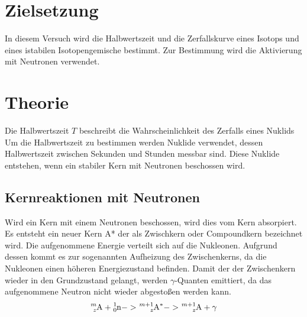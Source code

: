 \section{Zielsetzung}
In diesem Versuch wird die Halbwertszeit und die Zerfallskurve eines Isotops und eines istabilen Isotopengemische bestimmt.
Zur Bestimmung wird die Aktivierung mit Neutronen verwendet.
\section{Theorie}
\label{sec:Theorie}
Die Halbwertszeit $T$ beschreibt die Wahrscheinlichkeit des Zerfalls eines Nuklids
Um die Halbwertszeit zu bestimmen werden Nuklide verwendet, dessen Halbwertszeit zwischen Sekunden und Stunden messbar sind.
Diese Nuklide entstehen, wenn ein stabiler Kern mit Neutronen beschossen wird.

\subsection{Kernreaktionen mit Neutronen}
Wird ein Kern mit einem Neutronen beschossen, wird dies vom Kern absorpiert.
Es entsteht ein neuer Kern A* der als Zwischkern oder Compoundkern bezeichnet wird.
Die aufgenommene Energie verteilt sich auf die Nukleonen.
Aufgrund dessen kommt es zur sogenannten Aufheizung des Zwischenkerns, da die Nukleonen einen höheren Energiezustand befinden.
Damit der der Zwischenkern wieder in den Grundzustand gelangt, werden $\gamma$-Quanten emittiert, da das aufgenommene Neutron nicht wieder abgestoßen werden kann.
\begin{equation}
    \ce{^{m}_{z}A} + \ce{^{1}_{0}n} -> \ce{^{m+1}_{z}A^*} -> \ce{^{m+1}_{z}A} + \gamma
\end{equation}

\cite{sample}
